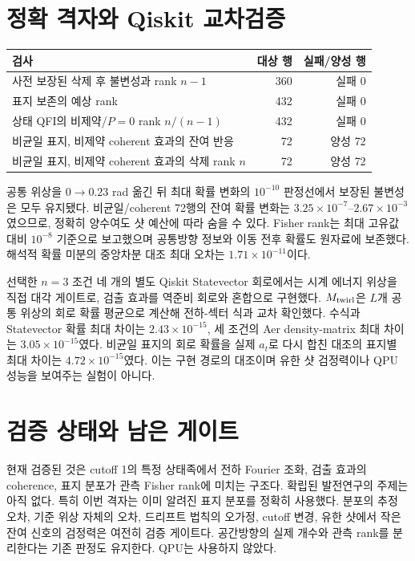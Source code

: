 \documentclass[11pt,a4paper]{article}
\begin{document}
\section{정확 격자와 Qiskit 교차검증}
\begin{center}
\begin{tabular}{@{}lrr@{}}
\toprule
검사 & 대상 행 & 실패/양성 행 \\
\midrule
사전 보장된 삭제 후 불변성과 rank $n-1$ & 360 & 실패 0 \\
표지 보존의 예상 rank & 432 & 실패 0 \\
상태 QFI의 비제약/$P=0$ rank $n/(n-1)$ & 432 & 실패 0 \\
비균일 표지, 비제약 coherent 효과의 잔여 반응 & 72 & 양성 72 \\
비균일 표지, 비제약 coherent 효과의 삭제 rank $n$ & 72 & 양성 72 \\
\bottomrule
\end{tabular}
\end{center}
공통 위상을 $0\to0.23$ rad 옮긴 뒤 최대 확률 변화의
$10^{-10}$ 판정선에서 보장된 불변성은 모두 유지됐다.
비균일/coherent 72행의 잔여 확률 변화는
$3.25\times10^{-7}$--$2.67\times10^{-3}$였으므로,
정확히 양수여도 샷 예산에 따라 숨을 수 있다. Fisher rank는 최대
고유값 대비 $10^{-8}$ 기준으로 보고했으며 공통방향 정보와
이동 전후 확률도 원자료에 보존했다. 해석적 확률 미분의 중앙차분
대조 최대 오차는 $1.71\times10^{-11}$이다.

선택한 $n=3$ 조건 네 개의 별도 Qiskit Statevector 회로에서는
시계 에너지 위상을 직접 대각 게이트로, 검출 효과를 역준비 회로와
혼합으로 구현했다. $M_{\rm twirl}$은 $L$개 공통 위상의 회로
확률 평균으로 계산해 전하-섹터 식과 교차 확인했다.
수식과 Statevector 확률 최대 차이는 $2.43\times10^{-15}$,
세 조건의 Aer density-matrix 최대 차이는 $3.05\times10^{-15}$였다.
비균일 표지의 회로 확률을 실제 $a_t$로 다시 합친 대조의
표지별 최대 차이는 $4.72\times10^{-15}$였다.
이는 구현 경로의 대조이며 유한 샷 검정력이나 QPU 성능을
보여주는 실험이 아니다.

\section{검증 상태와 남은 게이트}
현재 검증된 것은 cutoff 1의 특정 상태족에서 전하 Fourier 조화,
검출 효과의 coherence, 표지 분포가 관측 Fisher rank에 미치는
구조다. 확립된 발전연구의 주제는 아직 없다. 특히 이번 격자는
이미 알려진 표지 분포를 정확히 사용했다. 분포의 추정 오차,
기준 위상 자체의 오차, 드리프트 법칙의 오가정, cutoff 변경,
유한 샷에서 작은 잔여 신호의 검정력은 여전히 검증 게이트다.
공간방향의 실제 개수와 관측 rank를 분리한다는 기존 판정도 유지한다.
QPU는 사용하지 않았다.
\end{document}
